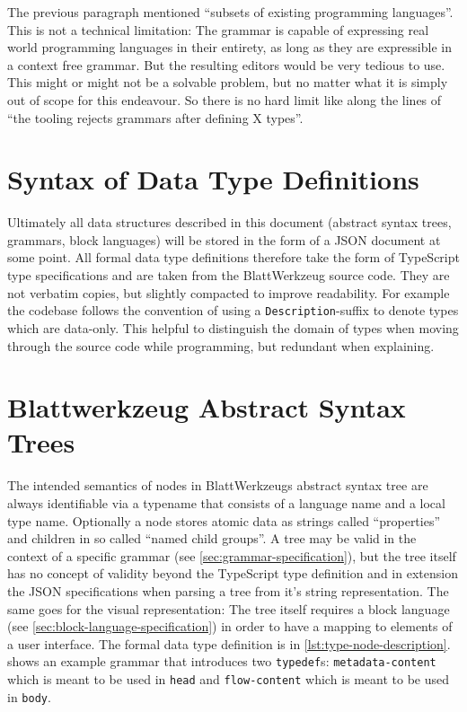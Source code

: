 \documentclass[]{report}
\begin{document}
The previous paragraph mentioned \enquote{subsets of existing programming languages}. This is not a technical limitation: The grammar is capable of expressing real world programming languages in their entirety, as long as they are expressible in a context free grammar. But the resulting editors would be very tedious to use. This might or might not be a solvable problem, but no matter what it is simply out of scope for this endeavour. So there is no hard limit like along the lines of \enquote{the tooling rejects grammars after defining X types}.

\section{Syntax of Data Type Definitions}

Ultimately all data structures described in this document (abstract syntax trees, grammars, block languages) will be stored in the form of a JSON document at some point. All formal data type definitions therefore take the form of TypeScript type specifications and are taken from the Blatt\-Werkzeug source code. They are not verbatim copies, but slightly compacted to improve readability. For example the codebase follows the convention of using a \texttt{Description}-suffix to denote types which are data-only. This helpful to distinguish the domain of types when moving through the source code while programming, but redundant when explaining.

\section{Blattwerkzeug Abstract Syntax Trees}
\label{sec:blattwerkzeug-ast}

The intended semantics of nodes in Blatt\-Werkzeugs abstract syntax tree are always identifiable via a typename that consists of a language name and a local type name. Optionally a node stores atomic data as strings called \enquote{properties} and children in so called \enquote{named child groups}. A tree may be valid in the context of a specific grammar (see \cref{sec:grammar-specification}), but the tree itself has no concept of validity beyond the TypeScript type definition and in extension the JSON specifications when parsing a tree from it's string representation. The same goes for the visual representation: The tree itself requires a block language (see \cref{sec:block-language-specification}) in order to have a mapping to elements of a user interface. The formal data type definition is in \cref{lst:type-node-description}.  shows an example grammar that introduces two \texttt{typedef}s: \texttt{metadata-content} which is meant to be used in \texttt{head} and \texttt{flow-content} which is meant to be used in \texttt{body}.
\end{document}
